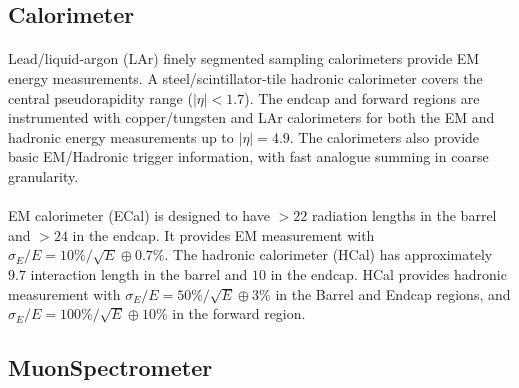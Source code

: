 \subsection{Calorimeter}
\paragraph{}
Lead/liquid-argon (LAr) finely segmented sampling calorimeters provide EM energy measurements. 
A steel/scintillator-tile hadronic calorimeter covers the central pseudorapidity range ($|\eta| < 1.7$).
The endcap and forward regions are instrumented with copper/tungsten and LAr calorimeters for both the EM and hadronic energy measurements up to $|\eta| = 4.9$. The calorimeters also provide basic EM/Hadronic trigger information, with fast analogue summing in coarse granularity.
\paragraph{}
EM calorimeter (ECal) is designed to have $>22$ radiation lengths in the barrel and $> 24$ in the endcap. 
It provides EM measurement with $\sigma_E/E = 10\%/\sqrt{E} \oplus 0.7\%$. The hadronic calorimeter (HCal) has approximately $9.7$ interaction length in the barrel and $10$ in the endcap. 
HCal provides hadronic measurement with $\sigma_E/E = 50\%/\sqrt{E} \oplus 3\%$ in the Barrel and Endcap regions, and $\sigma_E/E = 100\%/\sqrt{E} \oplus 10\%$  in the forward region.

\subsection{MuonSpectrometer}

